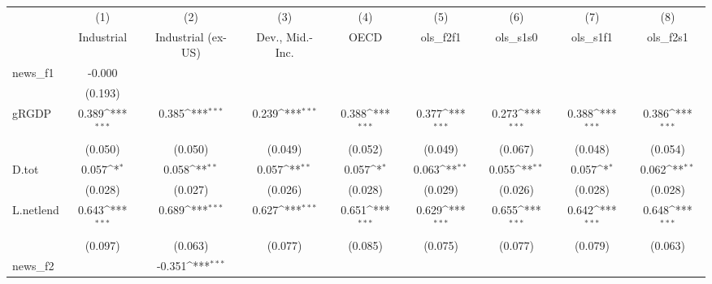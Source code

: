 {
\def\sym#1{\ifmmode^{#1}\else\(^{#1}\)\fi}
\begin{tabular}{l*{8}{c}}
\toprule
            &\multicolumn{1}{c}{(1)}&\multicolumn{1}{c}{(2)}&\multicolumn{1}{c}{(3)}&\multicolumn{1}{c}{(4)}&\multicolumn{1}{c}{(5)}&\multicolumn{1}{c}{(6)}&\multicolumn{1}{c}{(7)}&\multicolumn{1}{c}{(8)}\\
            &\multicolumn{1}{c}{Industrial}&\multicolumn{1}{c}{Industrial (ex-US)}&\multicolumn{1}{c}{Dev., Mid.-Inc.}&\multicolumn{1}{c}{OECD}&\multicolumn{1}{c}{ols\_f2f1}&\multicolumn{1}{c}{ols\_s1s0}&\multicolumn{1}{c}{ols\_s1f1}&\multicolumn{1}{c}{ols\_f2s1}\\
\midrule
news\_f1     &      -0.000         &                     &                     &                     &                     &                     &                     &                     \\
            &     (0.193)         &                     &                     &                     &                     &                     &                     &                     \\
\addlinespace
gRGDP       &       0.389\sym{***}&       0.385\sym{***}&       0.239\sym{***}&       0.388\sym{***}&       0.377\sym{***}&       0.273\sym{***}&       0.388\sym{***}&       0.386\sym{***}\\
            &     (0.050)         &     (0.050)         &     (0.049)         &     (0.052)         &     (0.049)         &     (0.067)         &     (0.048)         &     (0.054)         \\
\addlinespace
D.tot       &       0.057\sym{*}  &       0.058\sym{**} &       0.057\sym{**} &       0.057\sym{*}  &       0.063\sym{**} &       0.055\sym{**} &       0.057\sym{*}  &       0.062\sym{**} \\
            &     (0.028)         &     (0.027)         &     (0.026)         &     (0.028)         &     (0.029)         &     (0.026)         &     (0.028)         &     (0.028)         \\
\addlinespace
L.netlend   &       0.643\sym{***}&       0.689\sym{***}&       0.627\sym{***}&       0.651\sym{***}&       0.629\sym{***}&       0.655\sym{***}&       0.642\sym{***}&       0.648\sym{***}\\
            &     (0.097)         &     (0.063)         &     (0.077)         &     (0.085)         &     (0.075)         &     (0.077)         &     (0.079)         &     (0.063)         \\
\addlinespace
news\_f2     &                     &      -0.351\sym{***}&                     &                     &                     &                     &                     &                     \\

\end{tabular}}
